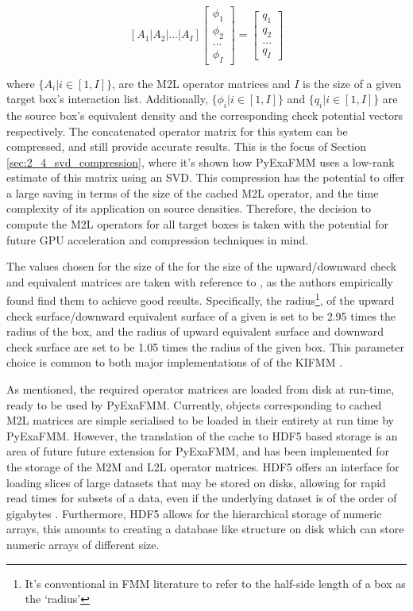 \begin{equation}
    \left [ A_1 | A_2 | ... | A_I \right] \begin{bmatrix} \phi_1 \\ \phi_2 \\  ... \\  \phi_I \end{bmatrix} = \begin{bmatrix} q_1\\ q_2\\  ... \\  q_I \end{bmatrix}
\end{equation}

where $\{A_i | i \in [1, I]\}$, are the M2L operator matrices and $I$ is the size of a given
target box's interaction list. Additionally, $\{\phi_i | i \in [1, I]\}$ and $\{q_i | i \in [1, I]\}$
are the source box's equivalent density and the corresponding check potential vectors
respectively. The concatenated operator matrix for this system can be compressed, and still
provide accurate results. This is the focus of Section \ref{sec:2_4_svd_compression},
where it's shown how \gls{PyExaFMM} uses a low-rank estimate of this matrix using
an \gls{SVD}. This compression has the potential to offer a large saving in terms
of the size of the cached M2L operator, and the time complexity of its application
on source densities. Therefore, the decision to compute the \gls{M2L} operators for
all target boxes is taken with the potential for future GPU acceleration and
compression techniques in mind.

The values chosen for the size of the for the size of the upward/downward
check and equivalent matrices are taken with reference to \cite{Malhotra:2015:CCP},
as the authors empirically found find them to achieve good results. Specifically,
the radius\footnote{It's conventional in FMM literature to refer to the half-side
length of a box as the `radius'}, of the upward check surface/downward equivalent
surface of a given is set to be 2.95 times the radius of the box, and the radius of
upward equivalent surface and downward check surface are set to be 1.05 times the radius
of the given box. This parameter choice is common to both major implementations of
of the \gls{KIFMM} \cite{exafmm,Malhotra:2015:CCP}.

As mentioned, the required operator matrices are loaded from disk at run-time, ready to
be used by \gls{PyExaFMM}. Currently, objects corresponding to cached \gls{M2L}
matrices are simple serialised to be loaded in their entirety at run time by
\gls{PyExaFMM}. However, the translation of the cache to HDF5 based storage is
an area of future future extension for \gls{PyExaFMM}, and has been implemented
for the storage of the \gls{M2M} and \gls{L2L} operator matrices. HDF5 offers an
interface for loading slices of large datasets that may be stored on disks, allowing
for rapid read times for subsets of a data, even if the underlying dataset
is of the order of gigabytes \cite{Wasser:NSF}. Furthermore, HDF5 allows for the
hierarchical storage of numeric arrays, this amounts to creating
a database like structure on disk which can store numeric arrays of different
size.

